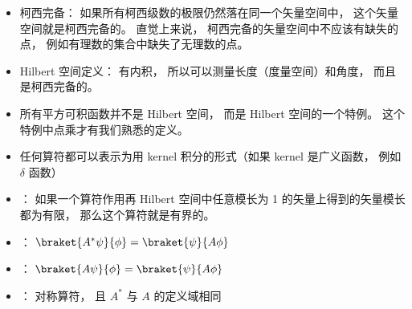 
\begin{itemize}
\item 柯西完备： 如果所有柯西级数的极限仍然落在同一个矢量空间中， 这个矢量空间就是柯西完备的。 直觉上来说， 柯西完备的矢量空间中不应该有缺失的点， 例如有理数的集合中缺失了无理数的点。
\item Hilbert 空间定义： 有内积， 所以可以测量长度（度量空间）和角度， 而且是柯西完备的。
\item 所有平方可积函数并不是 Hilbert 空间， 而是 Hilbert 空间的一个特例。 这个特例中点乘才有我们熟悉的定义。
\item 任何算符都可以表示为用 kernel 积分的形式（如果 kernel 是广义函数， 例如 $\delta$ 函数）
\item {}： 如果一个算符作用再 Hilbert 空间中任意模长为 1 的矢量上得到的矢量模长都为有限， 那么这个算符就是有界的。
\item {}： $\braket{A^* \psi}{\phi} = \braket{\psi}{A \phi}$
\item {}： $\braket{A \psi}{\phi} = \braket{\psi}{A \phi}$
\item {}： 对称算符， 且 $A^*$ 与 $A$ 的定义域相同
\end{itemize}
